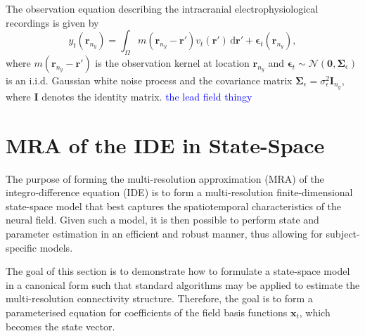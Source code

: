 \documentclass[review,authoryear,3p]{elsarticle}
\newcommand{\parham}[1]{\textcolor{blue}{#1}}
\begin{document}
The observation equation describing the intracranial electrophysiological recordings is given by
\begin{equation}\label{eq:ObservationEquation}
	y_t(\mathbf{r}_{n_y}) = \int_{\Omega} { m\left(\mathbf{r}_{n_y}-\mathbf{r}'\right) v_t\left(\mathbf{r}'\right) \, \mathrm{d}\mathbf{r}'} + \boldsymbol\epsilon_t(\mathbf{r}_{n_y}), 
\end{equation}
where $m\left(\mathbf{r}_{n_y}-\mathbf{r}'\right)$ is the observation kernel at location $\mathbf{r}_{n_y}$ and  $\boldsymbol{\epsilon}_{t}\sim \mathcal{N}\left(\mathbf{0},\mathbf{\Sigma}_{\epsilon}\right)$  is an i.i.d. Gaussian white noise process and the covariance matrix $\mathbf{\Sigma}_{\epsilon}=\sigma^2_{\epsilon}\mathbf I_{n_y}$, where $\mathbf I$ denotes the identity matrix. \parham{the lead field thingy} 

\section{MRA of the IDE in State-Space}
The purpose of forming the multi-resolution approximation (MRA) of the integro-difference equation (IDE) is to form a multi-resolution finite-dimensional state-space model that best captures the spatiotemporal characteristics of the neural field. Given such a model, it is then possible to perform state and parameter estimation in an efficient and robust manner, thus allowing for subject-specific models.

The goal of this section is to demonstrate how to formulate a state-space model in a canonical form such that standard algorithms may be applied to estimate the multi-resolution connectivity structure. Therefore, the goal is to form a parameterised equation for coefficients of the field basis functions $\mathbf{x}_t$, which becomes the state vector.
\end{document}
